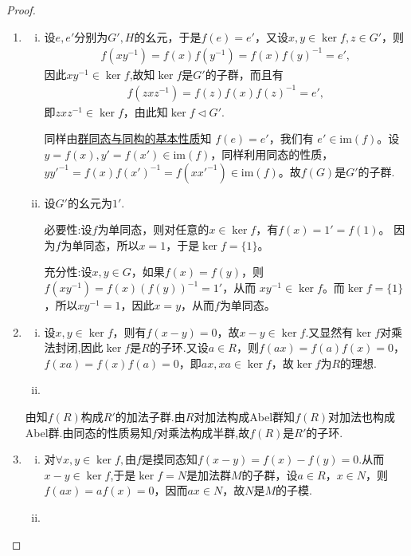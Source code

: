 \documentclass[../../main.tex]{subfiles}%
\begin{document}
\begin{proof}
\begin{enumerate}[(1)]
\item \begin{enumerate}[(i)]
\item 设$e, e'$分别为$G', H$的幺元，于是$f(e) = e'$，又设$x, y \in \ker f, z \in G'$，则
\begin{align*}
f(xy^{-1}) = f(x)f(y^{-1}) = f(x)f(y)^{-1} = e',
\end{align*}
因此$xy^{-1}\in \ker f$,故知$\ker f$是$G'$的子群，而且有
\begin{align*}
f(zxz^{-1}) = f(z)f(x)f(z)^{-1} = e',
\end{align*}
即$zxz^{-1} \in \ker f$，由此知$\ker f \lhd G'$.

同样由\hyperref[theorem:群同态与同构的基本性质]{群同态与同构的基本性质}知 $f(e)=e'$，我们有 $e'\in\mathrm{im}(f)$。设 $y = f(x),y' = f(x')\in\mathrm{im}(f)$，同样利用同态的性质，$yy'^{-1}=f(x)f(x')^{-1}=f(xx'^{-1})\in\mathrm{im}(f)$。故$f(G)$是$G'$的子群.

\item 设$G'$的幺元为$1'$.

{\heiti 必要性:}设$f$为单同态，则对任意的$x\in\ker f$，有$f(x)=1'=f(1)$。
因为$f$为单同态，所以$x=1$，于是$\ker f=\{1\}$。

{\heiti 充分性:}设$x,y\in G$，如果$f(x)=f(y)$，则$f(xy^{-1})=f(x)(f(y))^{-1}=1'$，从而
$xy^{-1}\in\ker f$。而$\ker f=\{1\}$，所以$xy^{-1}=1$，因此$x=y$，从而$f$为单同态。
\end{enumerate}

\item \begin{enumerate}[(i)]
\item 设$x,y \in \ker f$，则有$f(x - y) = 0$，故$x - y \in \ker f$.又显然有$\ker f$对乘法封闭,因此$\ker f$是$R$的子环.又设$a \in R$，则$f(ax) = f(a)f(x) = 0$，$f(xa) = f(x)f(a) = 0$，即$ax, xa \in \ker f$，故$\ker f$为$R$的理想.

\item 
\end{enumerate}

由知$f(R)$构成$R'$的加法子群.由$R$对加法构成Abel群知$f(R)$对加法也构成Abel群.由同态的性质易知$f$对乘法构成半群,故$f(R)$是$R'$的子环.

\item \begin{enumerate}[(i)]
\item 对$\forall x,y\in \ker f,$由$f$是摸同态知$f(x-y)=f(x)-f(y)=0$.从而$x-y\in \ker f$,于是$\ker f = N$是加法群$M$的子群，设$a \in R$，$x \in N$，则$f(ax) = af(x) = 0$，因而$ax \in N$，故$N$是$M$的子模. 

\item 
\end{enumerate}
\end{enumerate}

\end{proof}
\end{document}
